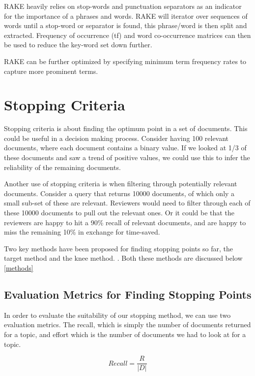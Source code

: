 RAKE heavily relies on stop-words and punctuation separators as an indicator for the importance of a phrases and words. RAKE will iterator over sequences of words until a stop-word or separator is found, this phrase/word is then split and extracted. Frequency of occurrence (tf) and word co-occurrence matrices can then be used to reduce the key-word set down further.

RAKE can be further optimized by specifying minimum term frequency rates to capture more prominent terms.


\section{Stopping Criteria} \label{stops}

Stopping criteria is about finding the optimum point in a set of documents. This could be useful in a decision making process. Consider having 100 relevant documents, where each document contains a binary value. If we looked at 1/3 of these documents and saw a trend of positive values, we could use this to infer the reliability of the remaining documents.

Another use of stopping criteria is when filtering through potentially relevant documents. Consider a query that returns 10000 documents, of which only a small sub-set of these are relevant. Reviewers would need to filter through each of these 10000 documents to pull out the relevant ones. Or it could be that the reviewers are happy to hit a 90\% recall of relevant documents, and are happy to miss the remaining 10\% in exchange for time-saved.

Two key methods have been proposed for finding stopping points so far, the target method \cite{Satopa11} and the knee method. \cite{Cormack2016}. Both these methods are discussed below \ref{methods}


\subsection{Evaluation Metrics for Finding Stopping Points} \label{evalsstops}

In order to evaluate the suitability of our stopping method, we can use two evaluation metrics. The recall, which is simply the number of documents returned for a topic, and effort which is the number of documents we had to look at for a topic. 

\begin{equation}
Recall = \frac{R}{|D|}
\end{equation}

